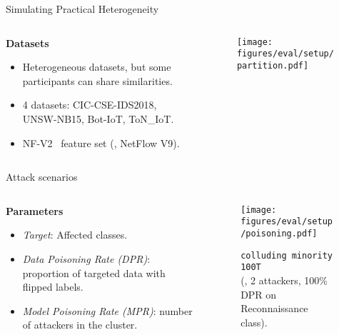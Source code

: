 \begin{frame}{Simulating Practical Heterogeneity}
  \begin{columns}
    \begin{column}{.5\textwidth}
      \textbf{Datasets}
      \begin{itemize}
        \item Heterogeneous datasets, but some participants can share similarities.
        \item 4 datasets: CIC-CSE-IDS2018, UNSW-NB15, Bot-IoT, ToN\_IoT.
        \item NF-V2~\autocite{sarhan_StandardFeatureSet_2021} feature set (\ie, NetFlow V9).
      \end{itemize}
    \end{column}
    \begin{column}{.5\textwidth}
      \begin{figure}
        \texttt{[image: figures/eval/setup/partition.pdf]}%
      \end{figure}
    \end{column}
  \end{columns}
\end{frame}

\begin{frame}{Attack scenarios}
    \begin{columns}
        \begin{column}{.5\textwidth}
            \textbf{Parameters}
            \begin{itemize}
                \item \textit{Target}: Affected classes.
                \item \textit{Data Poisoning Rate (DPR)}: proportion of targeted data with flipped labels.
                \item \textit{Model Poisoning Rate (MPR)}: number of attackers in the cluster.
            \end{itemize}
        \end{column}
        \begin{column}{.5\textwidth}
          \begin{figure}
            \captionsetup{font=small, labelfont=small}
            \texttt{[image: figures/eval/setup/poisoning.pdf]}%
            \captionsetup{justification=centering}
            \caption*{
              \texttt{colluding minority 100T}\\
              \smaller (\ie, 2 attackers, 100\% DPR on Reconnaissance class).
            }
          \end{figure}
        \end{column}
    \end{columns}
\end{frame}

